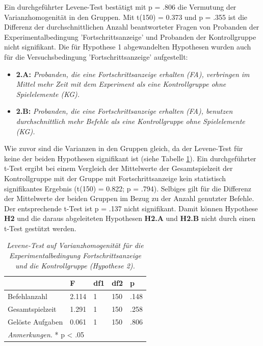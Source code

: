 Ein durchgeführter Levene-Test bestätigt mit p = .806 die Vermutung der Varianzhomogenität in den Gruppen. Mit t(150) = 0.373 und p = .355 ist die Differenz der durchschnittlichen Anzahl beantworteter Fragen von Probanden der Experimentalbedingung 'Fortschrittsanzeige' und Probanden der Kontrollgruppe nicht signifikant. Die für Hypothese 1 abgewandelten Hypothesen wurden auch für die Versuchsbedingung 'Fortschrittsanzeige' aufgestellt: 

\begin{itemize}
    \item \textbf{2.A:} \textit{Probanden, die eine Fortschrittsanzeige erhalten (FA), verbringen im Mittel mehr Zeit mit dem Experiment als eine Kontrollgruppe ohne Spielelemente (KG).}
    \item \textbf{2.B:} \textit{Probanden, die eine Fortschrittsanzeige erhalten (FA), benutzen durchschnittlich mehr Befehle als eine Kontrollgruppe ohne Spielelemente (KG).} 
\end{itemize}

 Wie zuvor sind die Varianzen in den Gruppen gleich, da der Levene-Test für keine der beiden Hypothesen signifikant ist (siehe Tabelle \ref{levene_hypo_2}). Ein durchgeführter t-Test ergibt bei einem Vergleich  der  Mittelwerte  der Gesamtspielzeit der Kontrollgruppe mit der Gruppe mit Fortschrittsanzeige kein statistisch signifikantes Ergebnis (t(150) = 0.822; p = .794). Selbiges gilt für die Differenz der Mittelwerte der beiden Gruppen im Bezug zu der Anzahl genutzter Befehle. Der entsprechende t-Test ist p = .137 nicht signifikant. Damit können Hypothese \textbf{H2} und die daraus abgeleiteten Hypothesen \textbf{H2.A} und \textbf{H2.B} nicht durch einen t-Test gestützt werden.


\begin{table}[htbp]
\centering
\caption{\textit{Levene-Test auf Varianzhomogenität für die Experimentalbedingung Fortschrittsanzeige und die Kontrollgruppe (Hypothese 2).}}
\begin{tabular}{ p{4cm} p{2.0cm} p{2.0cm} p{2.0cm} p{2.0cm} }
 \hline
 & F & df1 &df2 &p \\
 \hline
  Befehlanzahl      & 2.114     & 1 &   150 & .148\\
  Gesamtspielzeit   & 1.291     & 1 &   150 & .258\\
  Gelöste Aufgaben  & 0.061     & 1 &   150 & .806\\
 \hline
  \multicolumn{5}{l}{%
 \small%
\textit{Anmerkungen}. * p < .05
}\\
\end{tabular}
\label{levene_hypo_2}
\end{table}

